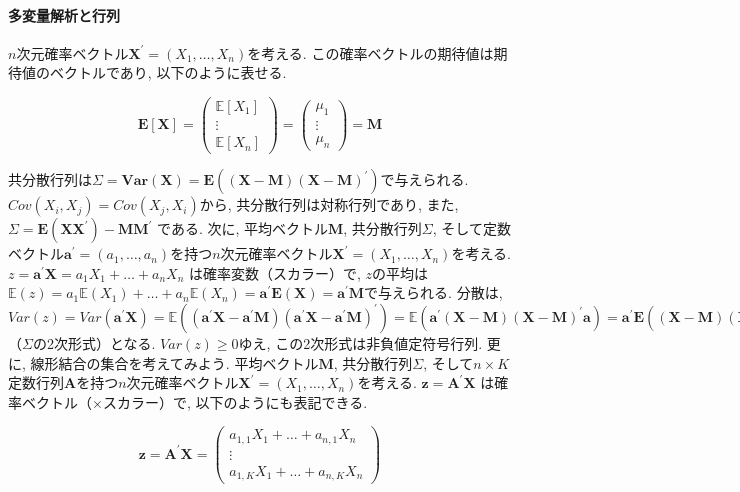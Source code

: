 \documentclass[paper=a4paper,fontsize=10pt]{jlreq}
\begin{document}
\paragraph{多変量解析と行列}
$n$次元確率ベクトル$\mathbf{X}^\prime=(X_1,\dots,X_n)$を考える. この確率ベクトルの期待値は期待値のベクトルであり, 以下のように表せる.

\begin{equation*}
  \mathbf{E[X]} = \begin{pmatrix} \mathbf{\mathbb{E}}[X_1] \\ \vdots \\ \mathbf{\mathbb{E}}[X_n] \end{pmatrix} = \begin{pmatrix} \mu_1 \\ \vdots \\ \mu_n \end{pmatrix} = \mathbf{M}
\end{equation*}

共分散行列は$\Sigma=\mathbf{Var(X)}=\mathbf{E((X-M)(X-M)^\prime)}$で与えられる. $Cov(X_i, X_j)=Cov(X_j, X_i)$から, 共分散行列は対称行列であり, また, $\Sigma=\mathbf{E(XX^\prime)}-\mathbf{MM^\prime}$ である. 次に, 平均ベクトル$\mathbf{M}$, 共分散行列$\Sigma$, そして定数ベクトル$\mathbf{a}^\prime=(a_1,\dots,a_n)$を持つ$n$次元確率ベクトル$\mathbf{X}^\prime=(X_1,\dots,X_n)$を考える. $z=\mathbf{a^\prime X}=a_1X_1+\dots+a_nX_n$ は確率変数（スカラー）で,  $z$の平均は$\mathbb{E}(z)=a_1\mathbb{E}(X_1)+\dots+a_n\mathbb{E}(X_n)=\mathbf{a^\prime E(X)}=\mathbf{a^\prime M}$で与えられる. 分散は, $Var(z)=Var(\mathbf{a^\prime X})=\mathbb{E}(\mathbf{(a^\prime X-a^\prime M)(a^\prime X-a^\prime M)^\prime})=\mathbb{E}(\mathbf{a^\prime (X-M)(X-M)^\prime a})=\mathbf{a^\prime}\mathbf{E}(\mathbf{(X-M)(X-M)^\prime })\mathbf{a}=\mathbf{a^\prime}\mathbf{Var(X)}\mathbf{a}=\mathbf{a^\prime} \Sigma \mathbf{a}$（$\Sigma$の2次形式）となる. $Var(z)\geq 0$ゆえ, この2次形式は非負値定符号行列. 更に, 線形結合の集合を考えてみよう. 平均ベクトル$\mathbf{M}$, 共分散行列$\Sigma$, そして$n\times K$定数行列$\mathbf{A}$を持つ$n$次元確率ベクトル$\mathbf{X}^\prime=(X_1,\dots,X_n)$を考える. $\mathbf{z}=\mathbf{A^\prime X}$ は確率ベクトル（×スカラー）で, 以下のようにも表記できる.

\begin{equation*}
  \mathbf{z}=\mathbf{A^\prime X} = \begin{pmatrix} a_{1, 1}X_1+\dots+a_{n, 1}X_n \\ \vdots \\ a_{1, K}X_1+\dots+a_{n, K}X_n \end{pmatrix}
\end{equation*}
\end{document}
